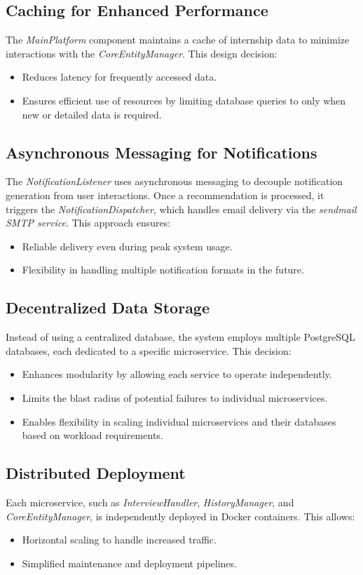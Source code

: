 \subsection{Caching for Enhanced Performance}
The \textit{MainPlatform} component maintains a cache of internship data to minimize interactions with the \textit{CoreEntityManager}. This design decision:
\begin{itemize}
    \item Reduces latency for frequently accessed data.
    \item Ensures efficient use of resources by limiting database queries to only when new or detailed data is required.
\end{itemize}

\subsection{Asynchronous Messaging for Notifications}
The \textit{NotificationListener} uses asynchronous messaging to decouple notification generation from user interactions. Once a recommendation is processed, it triggers the \textit{NotificationDispatcher}, which handles email delivery via the \textit{sendmail SMTP service}. This approach ensures:
\begin{itemize}
    \item Reliable delivery even during peak system usage.
    \item Flexibility in handling multiple notification formats in the future.
\end{itemize}

\subsection{Decentralized Data Storage}
Instead of using a centralized database, the system employs multiple PostgreSQL databases, each dedicated to a specific microservice. This decision:
\begin{itemize}
    \item Enhances modularity by allowing each service to operate independently.
    \item Limits the blast radius of potential failures to individual microservices.
    \item Enables flexibility in scaling individual microservices and their databases based on workload requirements.
\end{itemize}

\subsection{Distributed Deployment}
Each microservice, such as \textit{InterviewHandler}, \textit{HistoryManager}, and \textit{CoreEntityManager}, is independently deployed in Docker containers. This allows:
\begin{itemize}
    \item Horizontal scaling to handle increased traffic.
    \item Simplified maintenance and deployment pipelines.
\end{itemize}

